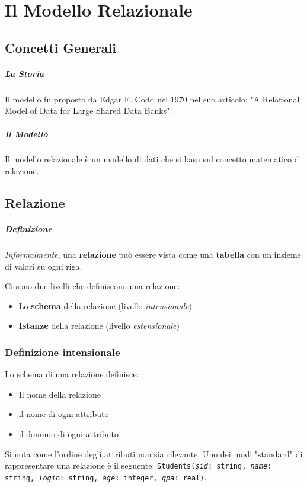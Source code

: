 \chapter{Il Modello Relazionale}
\label{cap:il-modello-relazionale}
\thispagestyle{chapterInit}

\section{Concetti Generali}
    \paragraph{La Storia} Il modello fu proposto da Edgar F. Codd nel 1970 nel suo articolo: "A Relational Model of Data for Large Shared Data Banks".
    \paragraph{Il Modello} Il modello relazionale è un modello di dati che si basa sul concetto matematico di relazione.
\section{Relazione} 
    \paragraph{Definizione}
        \textit{Informalmente}, una \textbf{relazione} può essere vista come una \textbf{tabella} con un insieme di valori su ogni riga. 
        
        Ci sono due livelli che definiscono una relazione:
        \begin{itemize}
            \item Lo \textbf{schema} della relazione (livello \textit{intensionale})
            \item \textbf{Istanze} della relazione (livello \textit{estensionale})  
        \end{itemize}
    \subsection{Definizione intensionale} Lo schema di una   relazione definisce:
            \begin{itemize}
                \item Il nome della relazione
                \item il nome di ogni attributo
                \item il dominio di ogni attributo
            \end{itemize}
            Si nota come l'ordine degli attributi non sia rilevante. Uno dei modi "standard" di rappresentare una relazione è il seguente: \texttt{Students(\textit{sid}: string, \textit{name}: string, \textit{login}: string, \textit{age}: integer, \textit{gpa}: real)}.
